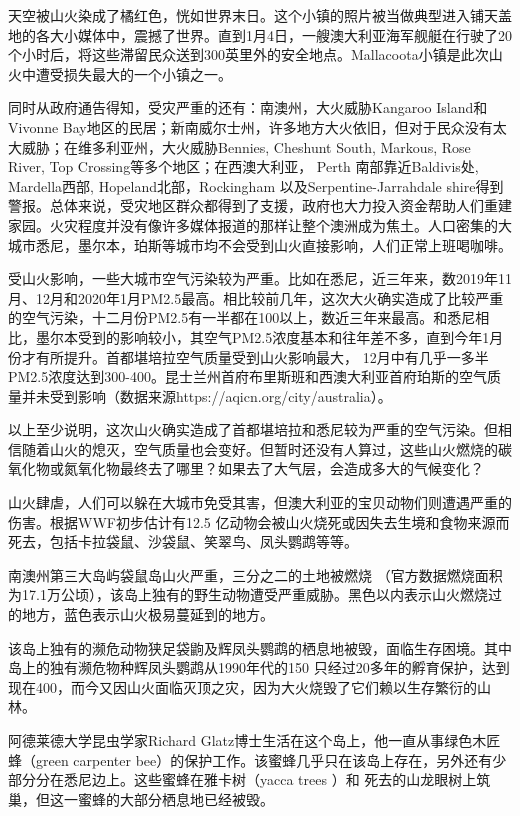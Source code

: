 \documentclass[]{book}
\begin{document}
天空被山火染成了橘红色，恍如世界末日。这个小镇的照片被当做典型进入铺天盖地的各大小媒体中，震撼了世界。直到1月4日，一艘澳大利亚海军舰艇在行驶了20个小时后，将这些滞留民众送到300英里外的安全地点。Mallacoota小镇是此次山火中遭受损失最大的一个小镇之一。

同时从政府通告得知，受灾严重的还有：南澳州，大火威胁Kangaroo Island和Vivonne Bay地区的民居；新南威尔士州，许多地方大火依旧，但对于民众没有太大威胁；在维多利亚州，大火威胁Bennies, Cheshunt South, Markous, Rose River, Top Crossing等多个地区；在西澳大利亚， Perth 南部靠近Baldivis处, Mardella西部, Hopeland北部，Rockingham 以及Serpentine-Jarrahdale shire得到警报。总体来说，受灾地区群众都得到了支援，政府也大力投入资金帮助人们重建家园。火灾程度并没有像许多媒体报道的那样让整个澳洲成为焦土。人口密集的大城市悉尼，墨尔本，珀斯等城市均不会受到山火直接影响，人们正常上班喝咖啡。

受山火影响，一些大城市空气污染较为严重。比如在悉尼，近三年来，数2019年11月、12月和2020年1月PM2.5最高。相比较前几年，这次大火确实造成了比较严重的空气污染，十二月份PM2.5有一半都在100以上，数近三年来最高。和悉尼相比，墨尔本受到的影响较小，其空气PM2.5浓度基本和往年差不多，直到今年1月份才有所提升。首都堪培拉空气质量受到山火影响最大， 12月中有几乎一多半PM2.5浓度达到300-400。昆士兰州首府布里斯班和西澳大利亚首府珀斯的空气质量并未受到影响（数据来源https://aqicn.org/city/australia）。

以上至少说明，这次山火确实造成了首都堪培拉和悉尼较为严重的空气污染。但相信随着山火的熄灭，空气质量也会变好。但暂时还没有人算过，这些山火燃烧的碳氧化物或氮氧化物最终去了哪里？如果去了大气层，会造成多大的气候变化？

山火肆虐，人们可以躲在大城市免受其害，但澳大利亚的宝贝动物们则遭遇严重的伤害。根据WWF初步估计有12.5 亿动物会被山火烧死或因失去生境和食物来源而死去，包括卡拉袋鼠、沙袋鼠、笑翠鸟、凤头鹦鹉等等。

南澳州第三大岛屿袋鼠岛山火严重，三分之二的土地被燃烧 （官方数据燃烧面积为17.1万公顷），该岛上独有的野生动物遭受严重威胁。黑色以内表示山火燃烧过的地方，蓝色表示山火极易蔓延到的地方。

该岛上独有的濒危动物狭足袋鼩及辉凤头鹦鹉的栖息地被毁，面临生存困境。其中岛上的独有濒危物种辉凤头鹦鹉从1990年代的150 只经过20多年的孵育保护，达到现在400，而今又因山火面临灭顶之灾，因为大火烧毁了它们赖以生存繁衍的山林。

阿德莱德大学昆虫学家Richard Glatz博士生活在这个岛上，他一直从事绿色木匠蜂（green carpenter bee）的保护工作。该蜜蜂几乎只在该岛上存在，另外还有少部分分在悉尼边上。这些蜜蜂在雅卡树（yacca trees ）和 死去的山龙眼树上筑巢，但这一蜜蜂的大部分栖息地已经被毁。
\end{document}
